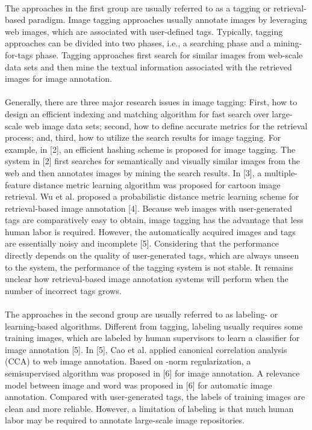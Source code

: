\documentclass[a4paper,11pt]{report}
\begin{document}
\paragraph{}The approaches in the first group are usually referred to as a
tagging or retrieval-based paradigm. Image tagging approaches
usually annotate images by leveraging web images, which are
associated with user-defined tags. Typically, tagging approaches
can be divided into two phases, i.e., a searching phase and a
mining-for-tags phase. Tagging approaches first search for similar
images from web-scale data sets and then mine the textual
information associated with the retrieved images for image
annotation.
\paragraph{} Generally, there are three major research issues in
image tagging: First, how to design an efficient indexing and
matching algorithm for fast search over large-scale web image
data sets; second, how to define accurate metrics for the retrieval
process; and, third, how to utilize the search results for image
tagging. For example, in [2], an efficient hashing scheme is proposed
for image tagging. The system in [2] first searches for
semantically and visually similar images from the web and then
annotates images by mining the search results. In [3], a multiple-
feature distance metric learning algorithm was proposed
for cartoon image retrieval. Wu et al. proposed a probabilistic
distance metric learning scheme for retrieval-based image annotation
[4]. Because web images with user-generated tags are
comparatively easy to obtain, image tagging has the advantage
that less human labor is required. However, the automatically
acquired images and tags are essentially noisy and incomplete
[5]. Considering that the performance directly depends on the quality of user-generated tags, which are always unseen to the
system, the performance of the tagging system is not stable. It
remains unclear how retrieval-based image annotation systems
will perform when the number of incorrect tags grows.

\paragraph{}The approaches in the second group are usually referred to as
labeling- or learning-based algorithms. Different from tagging,
labeling usually requires some training images, which are labeled
by human supervisors to learn a classifier for image annotation
[5]. In [5], Cao et al. applied canonical correlation analysis
(CCA)  to web image annotation. Based on -norm
regularization, a semisupervised algorithm was proposed in [6]
for image annotation. A relevance model between image and
word was proposed in [6] for automatic image annotation. Compared
with user-generated tags, the labels of training images are
clean and more reliable. However, a limitation of labeling is
that much human labor may be required to annotate large-scale
image repositories.
\end{document}
